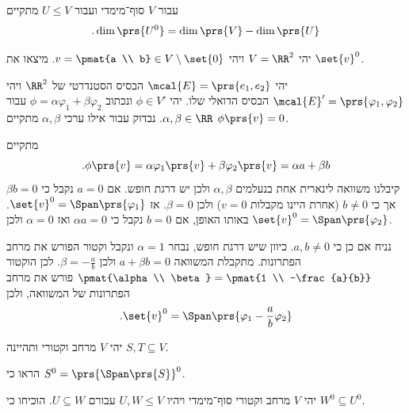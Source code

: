 \documentclass[a4paper,10pt,twoside,openany]{book}
\begin{document}
\begin{proposition}
עבור
$V$
סוף־מימדי ועבור
$U \leq V$
מתקיים
\begin{align*}
\text{.} \dim\prs{U^0} = \dim\prs{V} - \dim\prs{U}
\end{align*}
\end{proposition}

\begin{exercisechap}
יהי
$V = \RR^2$
ויהי
$v = \pmat{a \\ b} \in V \setminus \set{0}$.
מיצאו את
$\set{v}^0$.
\end{exercisechap}

\begin{solution}
יהי
$\mcal{E} = \prs{e_1, e_2}$
הבסיס הסטנדרטי של
$\RR^2$
ויהי
$\mcal{E}' = \prs{\varphi_1, \varphi_2}$
הבסיס הדואלי שלו. יהי
$\phi \in V'$
ונכתוב
$\phi = \alpha \varphi_1 + \beta \varphi_2$
עבור
$\alpha,\beta \in \RR$.
נבדוק עבור אילו ערכי
$\alpha,\beta$
מתקיים
$\phi\prs{v} = 0$.

מתקיים
\[\text{.} \phi\prs{v} = \alpha \varphi_1\prs{v} + \beta \varphi_2\prs{v} = \alpha a + \beta b\]
קיבלנו משוואה לינארית אחת בנעלמים
$\alpha, \beta$
ולכן יש דרגת חופש. אם
$a=0$
נקבל כי
$\beta b = 0$
אך כי
$b \neq 0$
(אחרת היינו מקבלות
$v=0$)
ולכן
$\beta = 0$.
אז
$\set{v}^0 = \Span\prs{\varphi_1}$.
באותו האופן, אם
$b=0$
נקבל כי
$\alpha a = 0$
ואז
$\alpha = 0$
ולכן
$\set{v}^0 = \Span\prs{\varphi_2}$.

נניח אם כן כי
$a,b \neq 0$.
כיוון שיש דרגת חופש, נבחר
$\alpha=1$
ונקבל וקטור הפורש את מרחב הפתרונות.
מתקבלת המשוואה
$a + \beta b = 0$
ולכן
$\beta = - \frac{a}{b}$.
לכן הוקטור
$\pmat{\alpha \\ \beta} = \pmat{1 \\ -\frac{a}{b}}$
פורש את מרחב הפתרונות של המשוואה, ולכן
\begin{align*}
\text{.} \set{v}^0 = \Span\prs{\varphi_1 - \frac{a}{b} \varphi_2}
\end{align*}
\end{solution}

\begin{exercisechap}
יהי
$V$
מרחב וקטורי ותהיינה
$S,T \subseteq V$.

הראו כי
$S^0 = \prs{\Span\prs{S}}^0$.
\end{exercisechap}

\begin{exercisechap}
יהי
$V$
מרחב וקטורי סוף־מימדי ויהיו
$U,W \leq V$
עבורם
$U \subseteq W$.
הוכיחו כי
$W^0 \subseteq U^0$.
\end{exercisechap}
\end{document}

